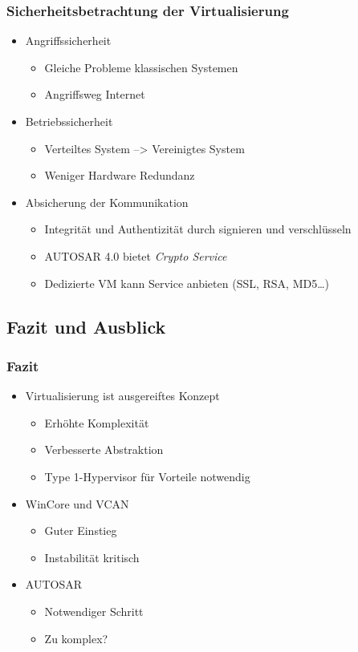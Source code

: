 \documentclass[]{beamer}
\begin{document}
\begin{frame}
\frametitle{Sicherheitsbetrachtung der Virtualisierung}
    \begin{itemize}
        \item Angriffssicherheit
        \begin{itemize}
            \item Gleiche Probleme klassischen Systemen
            \item Angriffsweg Internet
        \end{itemize}
        \pause
        \item Betriebssicherheit
        \begin{itemize}
            \item Verteiltes System --> Vereinigtes System
            \item Weniger Hardware Redundanz
        \end{itemize}
        \pause
        \item Absicherung der Kommunikation
        \begin{itemize}
            \item Integrität und Authentizität durch signieren und verschlüsseln
            \item AUTOSAR 4.0 bietet \emph{Crypto Service}
            \item Dedizierte VM kann Service anbieten (SSL, RSA, MD5\dots)
        \end{itemize}
    \end{itemize}
\end{frame}


\subsection{Fazit und Ausblick}
\begin{frame}
\frametitle{Fazit}
    \begin{itemize}
        \item Virtualisierung ist ausgereiftes Konzept
        \begin{itemize}
            \item Erhöhte Komplexität
            \item Verbesserte Abstraktion
            \item Type 1-Hypervisor für Vorteile notwendig
        \end{itemize}
        \item WinCore und VCAN
        \begin{itemize}
            \item Guter Einstieg
            \item Instabilität kritisch
        \end{itemize}
        \item AUTOSAR
        \begin{itemize}
            \item Notwendiger Schritt
            \item Zu komplex?
        \end{itemize}
    \end{itemize}
\end{frame}
\end{document}

